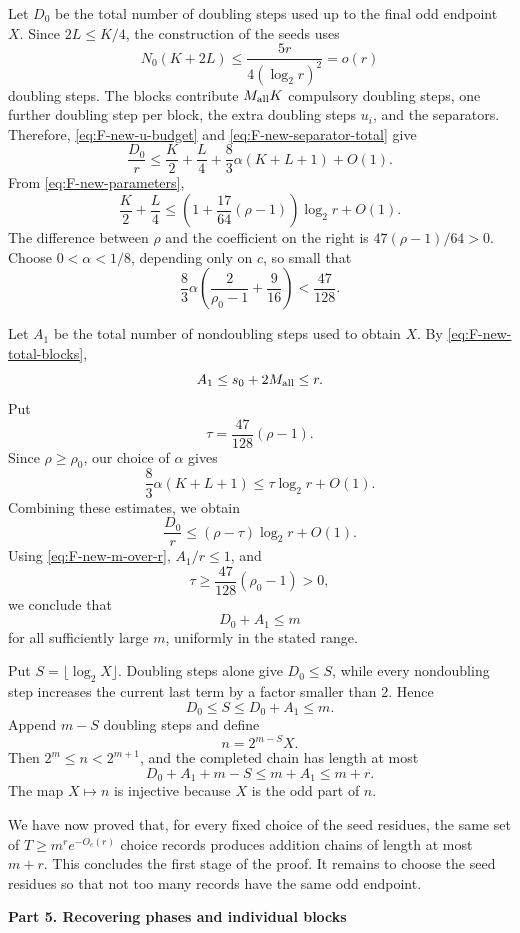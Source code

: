 \documentclass{article}
\theoremstyle{definition}
\begin{document}
Let $D_0$ be the total number of doubling steps used up to
the final odd endpoint $X$. Since $2L\le K/4$, the
construction of the seeds uses
$$
N_0(K+2L)\le\frac{5r}{4(\log_2r)^2}=o(r)
$$
doubling steps. The blocks contribute $M_{\rm all}K$
compulsory doubling steps, one further doubling step per
block, the extra doubling steps $u_i$, and the separators.
Therefore, \eqref{eq:F-new-u-budget} and
\eqref{eq:F-new-separator-total} give
$$
\frac{D_0}{r}
\le\frac K2+\frac L4
 +\frac83\alpha(K+L+1)+O(1).
$$
From \eqref{eq:F-new-parameters},
$$
\frac K2+\frac L4
\le\left(1+\frac{17}{64}(\rho-1)\right)\log_2r+O(1).
$$
The difference between $\rho$ and the coefficient on the
right is $47(\rho-1)/64>0$. Choose $0<\alpha<1/8$,
depending only on $c$, so small that
$$
\frac83\alpha
\left(\frac{2}{\rho_0-1}+\frac9{16}\right)
<\frac{47}{128}.
$$

Let $A_1$ be the total number of nondoubling steps used to
obtain $X$. By \eqref{eq:F-new-total-blocks},
$$
A_1\le s_0+2M_{\rm all}\le r.
$$
Put
$$
\tau=\frac{47}{128}(\rho-1).
$$
Since $\rho\ge\rho_0$, our choice of $\alpha$ gives
$$
\frac83\alpha(K+L+1)\le\tau\log_2r+O(1).
$$
Combining these estimates, we obtain
$$
\frac{D_0}{r}\le(\rho-\tau)\log_2r+O(1).
$$
Using \eqref{eq:F-new-m-over-r}, $A_1/r\le1$, and
$$
\tau\ge\frac{47}{128}(\rho_0-1)>0,
$$
we conclude that
$$
D_0+A_1\le m
$$
for all sufficiently large $m$, uniformly in the stated range.

Put $S=\lfloor\log_2X\rfloor$.  Doubling steps alone give $D_0\leq S$, while
every nondoubling step increases the current last term by a factor smaller
than $2$.  Hence
$$
 D_0\leq S\leq D_0+A_{1}\leq m.
$$
Append $m-S$ doubling steps and define
\begin{equation}
 n=2^{m-S}X.
 \label{eq:F-new-normalization}
\end{equation}
Then $2^m\leq n<2^{m+1}$, and the completed chain has length at most
$$
 D_0+A_{1}+m-S\leq m+A_{1}\leq m+r.
$$
The map $X\mapsto n$ is injective because $X$ is the odd part of $n$.

We have now proved that, for every fixed choice of the seed residues, the same
set of $T\geq m^re^{-O_c(r)}$ choice records produces addition chains of length at most $m+r$. This concludes the first stage of the proof. It
remains to choose the seed residues so that not too many records have the same
odd endpoint.


\vskip 10pt


\noindent
{\bf Part 5. Recovering phases and individual blocks}
\end{document}
